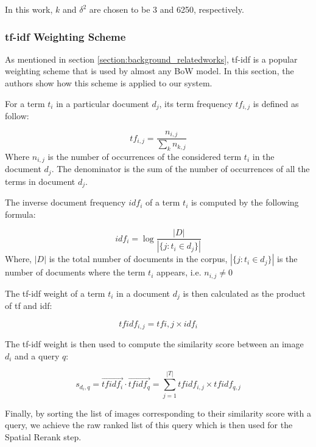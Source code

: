 In this work, $k$ and $\delta^2$ are chosen to be 3 and 6250, respectively.

\subsubsection{tf-idf Weighting Scheme} \label{section:tfidf_weighting}

As mentioned in section \ref{section:background_relatedworks}, tf-idf is a popular weighting scheme that is used by almost any BoW model. In this section, the authors show how this scheme is applied to our system.

For a term $t_{i}$ in a particular document $d_{j}$, its term frequency $tf_{i, j}$ is defined as follow:

\begin{equation} 
        tf_{i, j} = \frac{n_{i, j}}{\sum\limits_{k} n_{k, j}}
\end{equation}
Where $n_{i, j}$ is the number of occurrences of the considered term $t_{i}$ in the document $d_{j}$. The denominator is the sum of the number of occurrences of all the terms in document $d_{j}$.

The inverse document frequency $idf_{i}$ of a term $t_{i}$ is computed by the following formula:

\begin{equation}
        idf_{i} = \log{\frac{\left|D\right|}{\left|\{j: t_{i} \in d_{j}\}\right|}}
\end{equation}
Where, $\left|D\right|$ is the total number of documents in the corpus, $\left|\{j: t_{i} \in d_{j}\}\right|$ is the number of documents where the term $t_{i}$ appears, i.e. $n_{i, j} \ne 0$

The tf-idf weight of a term $t_{i}$ in a document $d_{j}$ is then calculated as the product of tf and idf:

\begin{equation}
{tfidf}_{i, j} = tf{i, j} \times idf_{i}
\end{equation}

The tf-idf weight is then used to compute the similarity score between an image $d_{i}$ and a query $q$:

\begin{equation}
s_{d_{i}, q} = \vec{{tfidf}_{i}} \cdot \vec{{tfidf}_{q}} = \sum\limits_{j = 1}^{\left|T\right|} {tfidf}_{i, j} \times {tfidf}_{q, j}
\end{equation} 

Finally, by sorting the list of images corresponding to their similarity score with a query, we achieve the raw ranked list of this query which is then used for the Spatial Rerank step.
